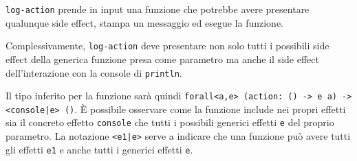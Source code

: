\lstinline{log-action} prende in input una funzione che potrebbe avere presentare qualunque side effect, stampa un messaggio ed esegue la funzione.

Complessivamente, \lstinline{log-action} deve presentare non solo tutti i possibili side effect della generica funzione presa come parametro ma anche il side effect dell'interazione con la console di \lstinline{println}.

Il tipo inferito per la funzione sarà quindi \lstinline{forall<a,e> (action: () -> e a) -> <console|e> ()}. È possibile osservare come la funzione include nei propri effetti sia il concreto effetto \lstinline{console} che tutti i possibili generici effetti \lstinline{e} del proprio parametro.
La notazione \lstinline{<e1|e>} serve a indicare che una funzione può avere tutti gli effetti \lstinline{e1} e anche tutti i generici effetti \lstinline{e}.
